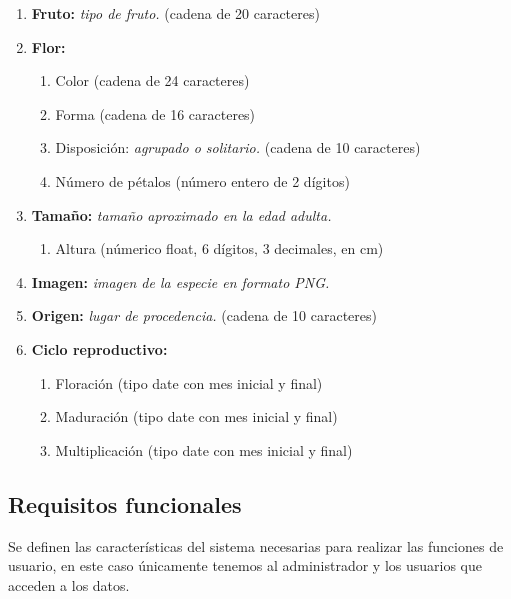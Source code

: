 \documentclass[10pt,a4paper]{article}
\begin{document}
\begin{enumerate}[label={RD\arabic*.} ,leftmargin=2.8\parindent]
\begin{enumerate}[label={RD10.\arabic*.}]
	\medskip	
	\item
		\textbf{Fruto:} \textit{tipo de fruto.} (cadena de 20 caracteres)

	\medskip
	\item
		\textbf{Flor:}
	\begin{enumerate} [label=-]
		\item Color (cadena de 24 caracteres)
		\item Forma (cadena de 16 caracteres)
		\item Disposición: \textit{agrupado o solitario.} (cadena de 10 caracteres)
		\item Número de pétalos (número entero de 2 dígitos)
	\end{enumerate}

	\medskip
	\item
		\textbf{Tamaño:} \textit{tamaño aproximado en la edad adulta.}
	\begin{enumerate}[label=-]
		\item Altura (númerico float, 6 dígitos, 3 decimales, en cm)
	\end{enumerate}
	
	\medskip	
	\item
		\textbf{Imagen:} \textit{imagen de la especie en formato PNG.}

	\medskip 
	\item
		\textbf{Origen:} \textit{lugar de procedencia.} (cadena de 10 caracteres)
		
	\medskip 
	\item
		\textbf{Ciclo reproductivo:}
	\begin{enumerate} [label=-]
		\item Floración (tipo date con mes inicial y final)
		\item Maduración (tipo date con mes inicial y final)
		\item Multiplicación (tipo date con mes inicial y final)
	\end{enumerate}
	\medskip \medskip
		\end{enumerate}
	

\end{enumerate}

\subsection{\textbf{Requisitos funcionales}}

Se definen las características del sistema necesarias para realizar las funciones de usuario, en este caso únicamente tenemos al administrador y los usuarios que acceden a los datos.
\end{document}
